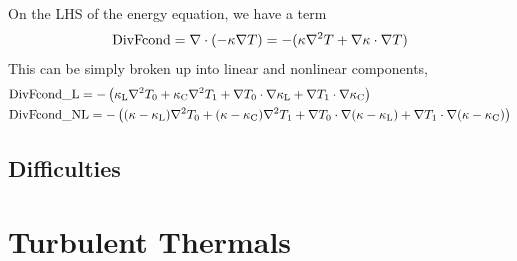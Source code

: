 On the LHS of the energy equation, we have a term
\begin{equation}
\text{DivFcond} = \nabla\cdot\left( -\kappa\nabla T\right) 
= -(\kappa\nabla^2 T + \nabla \kappa\cdot\nabla T)
\end{equation}
This can be simply broken up into linear and nonlinear components,
\begin{equation}
\begin{split}
&\text{DivFcond\_L} = -\left(\kappa_\text{L}\nabla^2 T_0 
+ \kappa_\text{C} \nabla^2 T_1 
+ \nabla T_0 \cdot \nabla \kappa_\text{L}
+ \nabla T_1 \cdot \nabla \kappa_\text{C}\right) \\
&\text{DivFcond\_NL} = -\left(
(\kappa - \kappa_\text{L})\nabla^2 T_0
+ (\kappa - \kappa_\text{C})\nabla^2 T_1
+ \nabla T_0 \cdot \nabla(\kappa - \kappa_\text{L}) 
+ \nabla T_1 \cdot \nabla(\kappa - \kappa_\text{C}) \right)
\end{split}
\end{equation}

\subsection{Difficulties}








\section{Turbulent Thermals}





